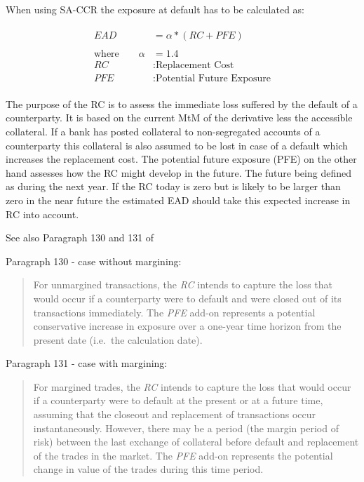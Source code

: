 \documentclass[../Thesis_AHoecherl.tex]{subfiles}
\begin{document}
When using \gls{SA-CCR} the exposure at default has to be
calculated as:

\begin{align}
	\begin{split}
		EAD &= \alpha * (RC + PFE)\\
		\\
		\text{where} \qquad \alpha&=1.4 \\
		RC&: \text{Replacement Cost} \\
		PFE&: \text{Potential Future Exposure}
	\end{split}
	\label{eq:SA-CCR EAD}
\end{align}

The purpose of the RC is to assess the immediate loss suffered by the
default of a counterparty. It is based on the current \gls{MtM} of the
derivative less the accessible collateral. If a bank has posted
collateral to non-segregated accounts of a counterparty this collateral
is also assumed to be lost in case of a default which increases the
replacement cost.
The potential future exposure (PFE) on the other hand assesses how the
RC might develop in the future. The future being defined as during the
next year. If the RC today is zero but is likely to be larger than zero in the
near future the estimated \gls{EAD} should take this expected increase in RC
into account.

See also Paragraph 130 and 131 of \cite{SACCR}

    Paragraph 130 - case without margining:

\begin{quote}
For unmargined transactions, the \emph{RC} intends to capture the loss
that would occur if a counterparty were to default and were closed out
of its transactions immediately. The \emph{PFE} add-on represents a
potential conservative increase in exposure over a one-year time horizon
from the present date (i.e.~the calculation date).
\end{quote}

Paragraph 131 - case with margining:

\begin{quote}
For margined trades, the \emph{RC} intends to capture the loss that
would occur if a counterparty were to default at the present or at a
future time, assuming that the closeout and replacement of transactions
occur instantaneously. However, there may be a period (the margin period
of risk) between the last exchange of collateral before default and
replacement of the trades in the market. The \emph{PFE} add-on
represents the potential change in value of the trades during this time
period.
\end{quote}
\end{document}
